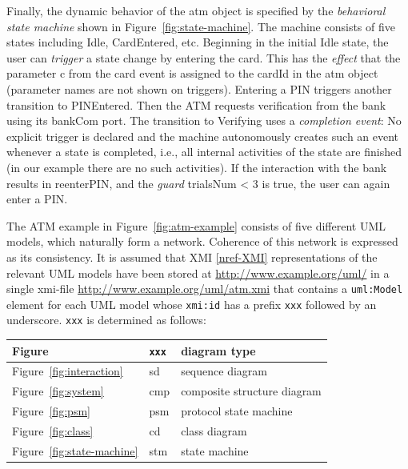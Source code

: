 \documentclass[10pt, a4paper]{isov2}
\renewcommand{\noterefname}{note}
\renewcommand{\nref}[1]{\noterefname~\ref{#1}}
\renewcommand{\nref}[1]{\ref{nref-#1}}
\newcommand{\uml}[1]{\textsf{#1}}
\begin{document}
Finally, the dynamic behavior of the \uml{atm} object is specified by
the \emph{behavioral state machine} shown in
Figure~\ref{fig:state-machine}. The machine consists of five states
including \uml{Idle}, \uml{CardEntered}, etc.  Beginning in the
initial \uml{Idle} state, the user can \emph{trigger} a state change
by entering the \uml{card}. This has the \emph{effect} that the
parameter \uml{c} from the \uml{card} event is assigned to the
\uml{cardId} in the \uml{atm} object (parameter names are not shown on
triggers). Entering a \uml{PIN} triggers another transition to
\uml{PINEntered}.  Then the ATM requests verification from the bank
using its \uml{bankCom} port.  The transition to \uml{Verifying} uses
a \emph{completion event}: No explicit trigger is declared and the
machine autonomously creates such an event whenever a state is
completed, i.e., all internal activities of the state are finished (in
our example there are no such activities).  If the interaction with
the bank results in \uml{reenterPIN}, and the \emph{guard}
\uml{trialsNum < 3} is true, the user can again enter a \uml{PIN}.


The ATM example in Figure~\ref{fig:atm-example} consists of five different
UML models, which naturally form a network. Coherence of this network is
expressed as its consistency.  It is assumed that XMI \nref{XMI} representations of
the relevant UML models have been stored at
\url{http://www.example.org/uml/} in a single xmi-file \url{http://www.example.org/uml/atm.xmi} that contains a
\texttt{uml:Model} element for each UML model whose \texttt{xmi:id} has
a prefix \texttt{xxx} followed by an underscore. \texttt{xxx} is determined
as follows:\medskip

\begin{tabular}{|l|l|l|}\hline
\textbf{Figure} & \textbf{\texttt{xxx}} & \textbf{diagram type}\\\hline
Figure~\ref{fig:interaction} & sd & sequence diagram\\\hline
Figure~\ref{fig:system} & cmp & composite structure diagram\\\hline
Figure~\ref{fig:psm} & psm & protocol state machine\\\hline
Figure~\ref{fig:class} & cd & class diagram\\\hline
Figure~\ref{fig:state-machine} & stm & state machine\\\hline
\end{tabular}
\end{document}
